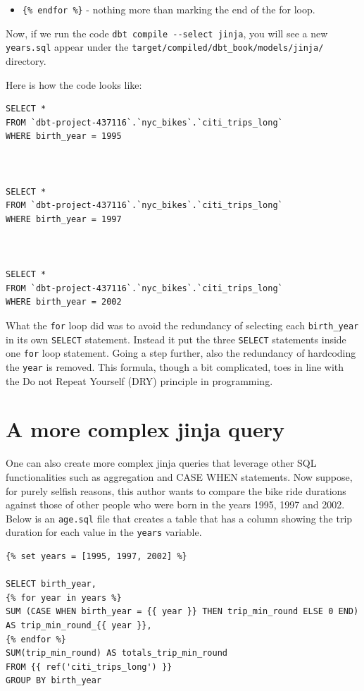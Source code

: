 \documentclass[
]{book}
\providecommand{\tightlist}{%
  \setlength{\itemsep}{0pt}\setlength{\parskip}{0pt}}
\begin{document}
\begin{itemize}
\tightlist
\item
  \texttt{\{\%\ endfor\ \%\}} - nothing more than marking the end of the for loop.
\end{itemize}

Now, if we run the code \texttt{dbt\ compile\ -\/-select\ jinja}, you will see a new \texttt{years.sql} appear under the \texttt{target/compiled/dbt\_book/models/jinja/} directory.

Here is how the code looks like:

\begin{verbatim}
SELECT * 
FROM `dbt-project-437116`.`nyc_bikes`.`citi_trips_long`
WHERE birth_year = 1995



SELECT * 
FROM `dbt-project-437116`.`nyc_bikes`.`citi_trips_long`
WHERE birth_year = 1997



SELECT * 
FROM `dbt-project-437116`.`nyc_bikes`.`citi_trips_long`
WHERE birth_year = 2002
\end{verbatim}

What the \texttt{for} loop did was to avoid the redundancy of selecting each \texttt{birth\_year} in its own \texttt{SELECT} statement. Instead it put the three \texttt{SELECT} statements inside one \texttt{for} loop statement. Going a step further, also the redundancy of hardcoding the \texttt{year} is removed. This formula, though a bit complicated, toes in line with the Do not Repeat Yourself (DRY) principle in programming.

\hypertarget{a-more-complex-jinja-query}{%
\section{A more complex jinja query}\label{a-more-complex-jinja-query}}

One can also create more complex jinja queries that leverage other SQL functionalities such as aggregation and CASE WHEN statements. Now suppose, for purely selfish reasons, this author wants to compare the bike ride durations against those of other people who were born in the years 1995, 1997 and 2002. Below is an \texttt{age.sql} file that creates a table that has a column showing the trip duration for each value in the \texttt{years} variable.

\begin{verbatim}
{% set years = [1995, 1997, 2002] %}

SELECT birth_year, 
{% for year in years %}
SUM (CASE WHEN birth_year = {{ year }} THEN trip_min_round ELSE 0 END) AS trip_min_round_{{ year }},
{% endfor %}
SUM(trip_min_round) AS totals_trip_min_round
FROM {{ ref('citi_trips_long') }}
GROUP BY birth_year
\end{verbatim}
\end{document}
